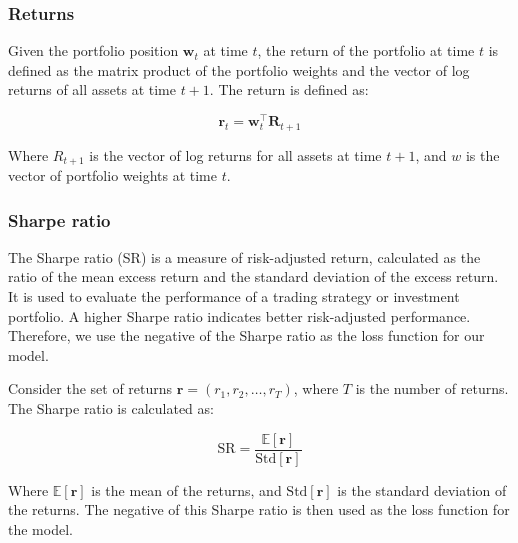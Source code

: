 \documentclass[12pt]{article}
\begin{document}
\subsubsection*{Returns}

Given the portfolio position $\mathbf{w}_t$ at time $t$, the return of the portfolio at time $t$ is defined as the matrix product of the portfolio weights and the vector of log returns of all assets at time $t+1$. The return is defined as:

\begin{equation}
    \mathbf{r}_t = \mathbf{w}_t^\top \mathbf{R}_{t+1}
    \label{eq:returns}
\end{equation}

\noindent
Where $R_{t+1}$ is the vector of log returns for all assets at time $t+1$, and $w$ is the vector of portfolio weights at time $t$. 

\subsubsection*{Sharpe ratio}

The Sharpe ratio (SR) is a measure of risk-adjusted return, calculated as the ratio of the mean excess return and the standard deviation of the excess return. It is used to evaluate the performance of a trading strategy or investment portfolio. A higher Sharpe ratio indicates better risk-adjusted performance. Therefore, we use the negative of the Sharpe ratio as the loss function for our model. 

\vspace{10pt}
\noindent
Consider the set of returns $\mathbf{r} = (r_1, r_2, \ldots, r_T)$, where $T$ is the number of returns. The Sharpe ratio is calculated as:

\begin{equation}
    \text{SR} = \frac{\mathbb{E}[\mathbf{r}]}{\text{Std}[\mathbf{r}]}    
    \label{eq:sharpe_ratio}
\end{equation}

\noindent
Where $\mathbb{E}[\mathbf{r}]$ is the mean of the returns, and $\text{Std}[\mathbf{r}]$ is the standard deviation of the returns. The negative of this Sharpe ratio is then used as the loss function for the model.

\clearpage





\end{document}
